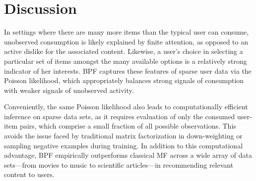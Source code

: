 \section{Discussion}

In settings where there are many more items than the typical user
can consume, unobserved consumption is likely explained by finite
attention, as opposed to an active dislike for the associated
content. Likewise, a user's choice in selecting a particular set of
items amongst the many available options is a relatively strong
indicator of her interests. BPF captures these features of sparse user
data via the Poisson likelihood, which appropriately balances strong
signals of consumption with weaker signals of unobserved activity.

Conveniently, the same Poisson likelihood also leads to
computationally efficient inference on sparse data sets, as it requires
evaluation of only the consumed user-item pairs, which comprise a
small fraction of all possible observations. This avoids the issue
faced by traditional matrix factorization in down-weighting or sampling
negative examples during training. In addition to this computational
advantage, BPF empirically outperforms classical MF across a wide array
of data sets---from movies to music to scientific articles---in
recommending relevant content to users.

